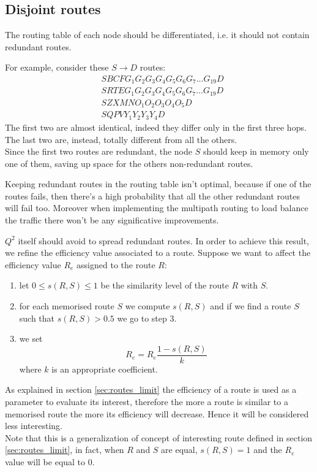 \documentclass[a4paper]{article}
\begin{document}
\subsection{Disjoint routes}
The routing table of each node should be differentiated, i.e. it should not
contain redundant routes.

For example, consider these $S \rightarrow D$ routes:
\begin{align}
	& SBCFG_1G_2G_3G_4G_5G_6G_7 \dots G_{19} D	\\
	& SRTEG_1G_2G_3G_4G_5G_6G_7 \dots G_{19} D	\\
	& SZXMNO_1O_2O_3O_4O_5D				\\
	& SQPVY_1Y_2Y_3Y_4D
\end{align}
The first two are almost identical, indeed they differ only in the first three
hops. The last two are, instead, totally different from all the others.\\
Since the first two routes are redundant, the node $S$ should keep in memory only
one of them, saving up space for the others non-redundant routes.
\newline

Keeping redundant routes in the routing table isn't optimal, because if one of the
routes fails, then there's a high probability that all the other redundant
routes will fail too. Moreover when implementing the multipath routing to load
balance the traffic there won't be any significative improvements.
\newline

$Q^2$ itself should avoid to spread redundant routes. In order to achieve
this result, we refine the efficiency value associated to a route. Suppose we
want to affect the efficiency value $R_e$ assigned to the route $R$:
\begin{enumerate}
	\item let $0\le s(R,S)\le 1$ be the similarity level of the route $R$
		with $S$.
	\item for each memorised route $S$ we compute $s(R,S)$ and if we find
		a route $S$ such that $s(R,S) > 0.5$ we go to step 3.
	\item we set \[R_e = R_e\frac{1-s(R,S)}{k}\] where $k$ is an appropriate
		coefficient.
\end{enumerate}
As explained in section \ref{sec:routes_limit} the efficiency of a route is
used as a parameter to evaluate its interest, therefore the more a route is
similar to a memorised route the more its efficiency will decrease. Hence it
will be considered less interesting.\\
Note that this is a generalization of concept of interesting route defined in
section \ref{sec:routes_limit}, in fact, when $R$ and $S$ are equal,
$s(R,S)=1$ and the $R_e$ value will be equal to $0$.
\end{document}
